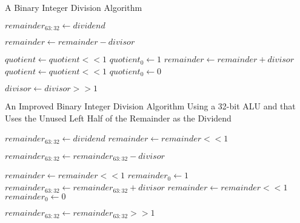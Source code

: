 \documentclass[11pt]{article}
\begin{document}
\begin{algorithm}[hbt!]
\caption{A Binary Integer Division Algorithm}\label{alg:div1}
\begin{algorithmic}

\State $remainder_{63:32} \gets dividend$

    \State $remainder \gets remainder - divisor$
    
        \State $quotient \gets quotient << 1$
        \State $quotient_{0} \gets 1$
    \Else
        \State $remainder \gets remainder + divisor$
        \State $quotient \gets quotient << 1$
        \State $quotient_{0} \gets 0$    
    \EndIf
    
    \State $divisor \gets divisor >> 1$
\EndFor

\end{algorithmic}
\end{algorithm}

\pagebreak

\begin{algorithm}[hbt!]
\caption{An Improved Binary Integer Division Algorithm Using a 32-bit ALU and that Uses the Unused Left Half of the Remainder as the Dividend}\label{alg:div1}
\begin{algorithmic}

\State $remainder_{63:32} \gets dividend$
\State $remainder \gets remainder << 1$

    \State $remainder_{63:32} \gets remainder_{63:32} - divisor$
    
        \State $remainder \gets remainder << 1$
        \State $remainder_{0} \gets 1$
    \Else
        \State $remainder_{63:32} \gets remainder_{63:32} + divisor$
        \State $remainder \gets remainder << 1$
        \State $remainder_{0} \gets 0$    
    \EndIf
    
    \State $remainder_{63:32} \gets remainder_{63:32} >> 1$
\EndFor

\end{algorithmic}
\end{algorithm}
\end{document}
